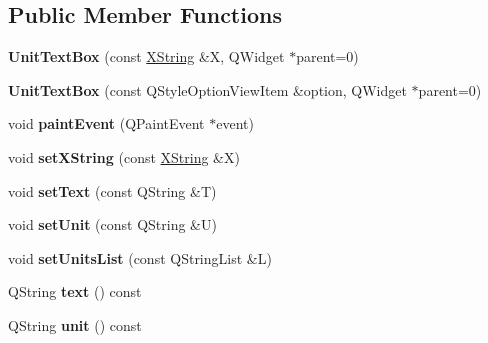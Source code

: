 \subsection*{Public Member Functions}
\begin{DoxyCompactItemize}
\item 
\mbox{\label{class_unit_text_box_aaac7ca5a429f173da1e949d89c98a617}} 
{\bfseries Unit\+Text\+Box} (const \hyperlink{class_x_string}{X\+String} \&X, Q\+Widget $\ast$parent=0)
\item 
\mbox{\label{class_unit_text_box_a48870efcd99169e9d9777e083b5bcb29}} 
{\bfseries Unit\+Text\+Box} (const Q\+Style\+Option\+View\+Item \&option, Q\+Widget $\ast$parent=0)
\item 
\mbox{\label{class_unit_text_box_ac67191a979db267b25fb65642ddd92cb}} 
void {\bfseries paint\+Event} (Q\+Paint\+Event $\ast$event)
\item 
\mbox{\label{class_unit_text_box_ae3bcda40d7aa71728988bdfe0fd26725}} 
void {\bfseries set\+X\+String} (const \hyperlink{class_x_string}{X\+String} \&X)
\item 
\mbox{\label{class_unit_text_box_a7b14532f1ddb45393f01252a543a39fc}} 
void {\bfseries set\+Text} (const Q\+String \&T)
\item 
\mbox{\label{class_unit_text_box_a89f7eed8d26e49f07c0f49745b871a8e}} 
void {\bfseries set\+Unit} (const Q\+String \&U)
\item 
\mbox{\label{class_unit_text_box_a5d6896cd14e5dfa23f442e8ed56aedf1}} 
void {\bfseries set\+Units\+List} (const Q\+String\+List \&L)
\item 
\mbox{\label{class_unit_text_box_a1c05250866221b1b3017a3fecd4d0a69}} 
Q\+String {\bfseries text} () const
\item 
\mbox{\label{class_unit_text_box_ad8e861fde516122ac72a4f1b8ab38562}} 
Q\+String {\bfseries unit} () const
\item 
\mbox{\label{class_unit_text_box_a7de6d2930686e5341c98d126a67378c7}} 

\end{DoxyCompactItemize}
